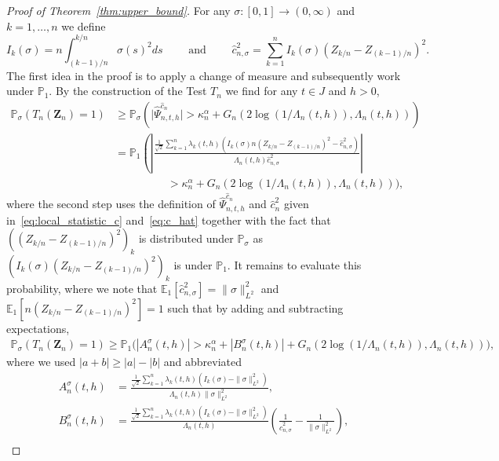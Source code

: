 \documentclass[10.5pt,letter]{article}
\numberwithin{equation}{section}
\theoremstyle{definition}
\newcommand{\E}{\mathbb{E}}
\renewcommand{\P}{\mathbb{P}}
\newcommand{\1}{\mathbbm{1}}
\begin{document}
\begin{proof}[Proof of Theorem~\ref{thm:upper_bound}]
For any $\sigma:[0,1]\rightarrow (0,\infty)$ and $k=1,\dots, n$ we define
\[ I_k(\sigma) = n\int_{(k-1)/n}^{k/n} \sigma(s)^2 ds \qquad\textrm{ and }\qquad \hat{c}_{n,\sigma}^2 = \sum_{k=1}^n I_k(\sigma)(Z_{k/n}-Z_{(k-1)/n})^2.\]
The first idea in the proof is to apply a change of measure and subsequently work under $\P_1$. By the construction of the Test $T_n$ we find for any $t\in J$ and $h>0$,
\begin{align*}
    \P_\sigma\left( T_n(\mathbf{Z}_n) =1\right) &\geq \P_\sigma\left( \big|\hat{\Psi}_{n,t,h}^{\hat{c}_n}\big| > \kappa_n^\alpha + G_n\left(2\log(1/\Lambda_n(t,h)), \Lambda_n(t,h)\right) \right) \\
    &= \P_1\left( \left| \frac{\frac{1}{\sqrt{2}}\sum_{k=1}^n \lambda_k(t,h) \left(I_k(\sigma)n(Z_{k/n}-Z_{(k-1)/n})^2 - \hat{c}_{n,\sigma}^2\right) }{ \Lambda_n(t,h) \hat{c}_{n,\sigma}^2}\right| \right.\\
    &\hspace{2cm} > \kappa_n^\alpha + G_n\left(2\log(1/\Lambda_n(t,h)), \Lambda_n(t,h)\right)\bigg),
\end{align*} 
where the second step uses the definition of $\hat{\Psi}_{n,t,h}^{\hat{c}_n}$ and $\hat{c}_n^2$ given in~\eqref{eq:local_statistic_c} and~\eqref{eq:c_hat} together with the fact that $((Z_{k/n}-Z_{(k-1)/n})^2)_k$ is distributed under $\P_\sigma$ as $(I_k(\sigma)(Z_{k/n}-Z_{(k-1)/n})^2)_k$ is under $\P_1$. It remains to evaluate this probability, where we note that $\E_1[\hat{c}_{n,\sigma}^2] = \|\sigma\|_{L^2}^2$ and $\E_1[n(Z_{k/n}-Z_{(k-1)/n})^2]=1$ such that by adding and subtracting expectations, 
\begin{align}\label{eq_proof:upper1}
    \P_\sigma\left( T_n(\mathbf{Z}_n) =1\right) \geq \P_1\Big( |A_n^\sigma(t,h)| > \kappa_n^\alpha + |B_n^\sigma(t,h)| + G_n\left(2\log(1/\Lambda_n(t,h)), \Lambda_n(t,h)\right) \Big),
\end{align} 
where we used $|a+b|\geq |a|-|b|$ and abbreviated
\begin{align*}
    A_n^\sigma(t,h) &= \frac{\frac{1}{\sqrt{2}}\sum_{k=1}^n \lambda_k(t,h)\left( I_k(\sigma) - \|\sigma\|_{L^2}^2\right)}{\Lambda_n(t,h) \|\sigma\|_{L^2}^2} ,\\
    B_n^\sigma(t,h) &= \frac{\frac{1}{\sqrt{2}}\sum_{k=1}^n \lambda_k(t,h)\left( I_k(\sigma) - \|\sigma\|_{L^2}^2\right)}{\Lambda_n(t,h)}\left(\frac{1}{\hat{c}_{n,\sigma}^2} - \frac{1}{\|\sigma\|_{L^2}^2}\right), \\

\end{align*}
\end{proof}
\end{document}
